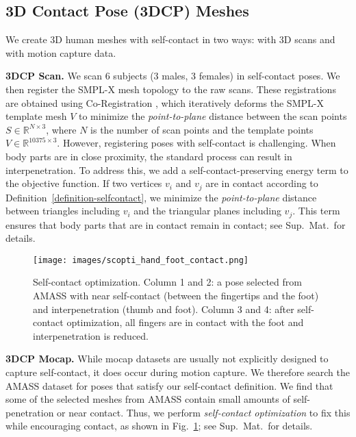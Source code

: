 \documentclass[final]{cvpr}
\newcommand{\suppmat}{Sup.~Mat.\xspace}
\theoremstyle{definition}
\begin{document}
\subsection{3D Contact Pose (3DCP) Meshes}
We create 3D human meshes with self-contact in two ways: with 3D scans and with motion capture data.

\textbf{3DCP Scan.}
We scan 6 subjects (3 males, 3 females) in self-contact poses. 
We then register the SMPL-X mesh topology to the raw scans.
These registrations are obtained using Co-Registration  \cite{Hirshberg:ECCV:2012}, which iteratively deforms the SMPL-X template mesh $V$ to minimize the \emph{point-to-plane} distance between the scan points $S \in \mathbb{R}^{N\times3}$, where $N$ is the number of scan points and the template points $V \in \mathbb{R}^{10375 \times 3}$.  
However, registering poses with self-contact is challenging. When body parts are in close proximity, the standard process can result in interpenetration. 
To address this, we add a self-contact-preserving energy term to the objective function. 
If two vertices $v_{i}$ and $v_{j}$ are in contact according to Definition~\ref{definition-selfcontact}, we minimize the \emph{point-to-plane} distance between triangles including $v_{i}$ and the triangular planes including  $v_{j}$. 
This term ensures that body parts that are in contact remain in contact; see {\suppmat}~for details.

\begin{figure}[t!]
\centerline{
		\texttt{[image: images/scopti\_hand\_foot\_contact.png]}
}
	\caption{Self-contact optimization. Column 1 and 2: a pose selected from AMASS with near self-contact (between the fingertips and the foot) and interpenetration (thumb and foot). Column 3 and 4: after self-contact optimization, all fingers are in contact with the foot and interpenetration is reduced. }
	\label{fig:BeforeAfterSelfContactOptimization}
\end{figure}

\textbf{3DCP Mocap.}
While mocap datasets are usually not explicitly designed to capture self-contact,
it does occur during motion capture. 
We therefore search the AMASS dataset for poses that satisfy our self-contact definition.
We find that some of the selected meshes from AMASS contain small amounts of self-penetration or near contact.
Thus, we perform \emph{self-contact optimization} to fix this while encouraging contact, as shown in Fig.~\ref{fig:BeforeAfterSelfContactOptimization}; see {\suppmat}~for details.
\end{document}
